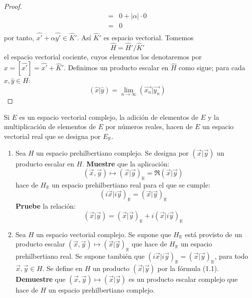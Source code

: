 \documentclass[12pt]{report}
\theoremstyle{largebreak}
\newcommand\abs[1]{\ensuremath{\big|#1\big|}}
\newcommand\pint[2]{\ensuremath{\left(#1\big|#2\right)}}
\begin{document}
\begin{proof}
\begin{equation*}
\begin{split}
                =&0+\abs{\alpha}\cdot0\\
                =&0\\
            \end{split}
        \end{equation*}
        por tanto, $\hat{x'}+\alpha\hat{y'}\in\hat{K}'$. Así $\hat{K}'$ es espacio vectorial. Tomemos
        \begin{equation*}
            \hat{H}=\hat{H}'/\hat{K}'
        \end{equation*}
        el espacio vectorial cociente, cuyos elementos los denotaremos por $\hat{x}=[\hat{x'}]=\hat{x'}+\hat{K}'$. Definimos un producto escalar en $\hat{H}$ como sigue; para cada $\hat{x},\hat{y}\in H$:
        \begin{equation*}
            \pint{\hat{x}}{\hat{y}}=\lim_{n\rightarrow\infty }\pint{\vec{x_n}}{\vec{y_n}}
        \end{equation*}

    \end{proof}

    \begin{excer}
        Si $E$ es un espacio vectorial complejo, la adición de elementos de $E$ y la multiplicación de elementos de $E$ por números reales, hacen de $E$ un espacio vectorial real que se designa por $E_\mathbb{R}$.
        \begin{enumerate}
            \item Sea $H$ un espacio prehilbertiano complejo. Se designa por $\pint{\vec{x}}{\vec{y}}$ un producto escalar en $H$. \textbf{Muestre} que la aplicación:
            \begin{equation*}
                (\vec{x},\vec{y})\mapsto\pint{\vec{x}}{\vec{y}}_\mathbb{R}=\Re\pint{\vec{x}}{\vec{y}}
            \end{equation*}
            hace de $H_\mathbb{R}$ un espacio prehilbertiano real para el que se cumple:
            \begin{equation*}
                \pint{i\vec{x}}{i\vec{y}}_\mathbb{R}=\pint{\vec{x}}{\vec{y}}_\mathbb{R}
            \end{equation*}
            \textbf{Pruebe} la relación:
            \begin{equation}
                \pint{\vec{x}}{\vec{y}}=\pint{\vec{x}}{\vec{y}}_\mathbb{R}+i\pint{\vec{x}}{i\vec{y}}_\mathbb{R}
            \end{equation}
            \item Sea $H$ un espacio vectorial complejo. Se supone que $H_\mathbb{R}$ está provisto de un producto escalar $(\vec{x},\vec{y})\mapsto\pint{\vec{x}}{\vec{y}}_\mathbb{R}$ que hace de $H_\mathbb{R}$ un espacio prehilbertiano real. Se supone también que $\pint{i\vec{x}}{i\vec{y}}_\mathbb{R}=\pint{\vec{x}}{\vec{y}}_\mathbb{R}$, para todo $\vec{x},\vec{y}\in H$. Se define en $H$ un producto $\pint{\vec{x}}{\vec{y}}$ por la fórmula (1.1). \textbf{Demuestre} que $(\vec{x},\vec{y})\mapsto\pint{\vec{x}}{\vec{y}}$ es un producto escalar complejo que hace de $H$ un espacio prehilbertiano complejo. 
        \end{enumerate}
    \end{excer}
\end{document}
